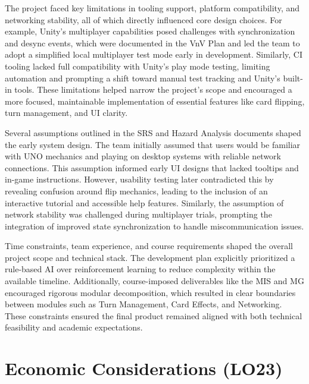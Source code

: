 \documentclass{article}
\begin{document}
The project faced key limitations in tooling support, platform compatibility, and networking stability, all of which directly influenced core design choices. For example, Unity’s multiplayer capabilities posed challenges with synchronization and desync events, which were documented in the VnV Plan and led the team to adopt a simplified local multiplayer test mode early in development. Similarly, CI tooling lacked full compatibility with Unity's play mode testing, limiting automation and prompting a shift toward manual test tracking and Unity’s built-in tools. These limitations helped narrow the project’s scope and encouraged a more focused, maintainable implementation of essential features like card flipping, turn management, and UI clarity.

Several assumptions outlined in the SRS and Hazard Analysis documents shaped the early system design. The team initially assumed that users would be familiar with UNO mechanics and playing on desktop systems with reliable network connections. This assumption informed early UI designs that lacked tooltips and in-game instructions. However, usability testing later contradicted this by revealing confusion around flip mechanics, leading to the inclusion of an interactive tutorial and accessible help features. Similarly, the assumption of network stability was challenged during multiplayer trials, prompting the integration of improved state synchronization to handle miscommunication issues.

Time constraints, team experience, and course requirements shaped the overall project scope and technical stack. The development plan explicitly prioritized a rule-based AI over reinforcement learning to reduce complexity within the available timeline. Additionally, course-imposed deliverables like the MIS and MG encouraged rigorous modular decomposition, which resulted in clear boundaries between modules such as Turn Management, Card Effects, and Networking. These constraints ensured the final product remained aligned with both technical feasibility and academic expectations.

\section{Economic Considerations (LO23)}

\end{document}
